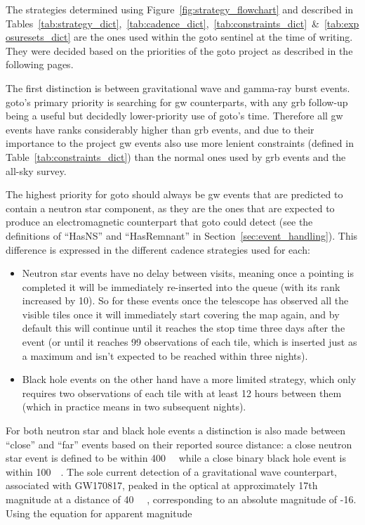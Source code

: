 \begin{colsection}
\begin{colsection}
The strategies determined using Figure~\ref{fig:strategy_flowchart} and described in Tables~\ref{tab:strategy_dict},~\ref{tab:cadence_dict},~\ref{tab:constraints_dict}~\&~\ref{tab:exposuresets_dict} are the ones used within the \gls{goto} sentinel at the time of writing. They were decided based on the priorities of the \gls{goto} project as described in the following pages.

The first distinction is between gravitational wave and gamma-ray burst events. \gls{goto}'s primary priority is searching for \gls{gw} counterparts, with any \gls{grb} follow-up being a useful but decidedly lower-priority use of \gls{goto}'s time. Therefore all \gls{gw} events have ranks considerably higher than \gls{grb} events, and due to their importance to the project \gls{gw} events also use more lenient constraints (defined in Table~\ref{tab:constraints_dict}) than the normal ones used by \gls{grb} events and the all-sky survey.

The highest priority for \gls{goto} should always be \gls{gw} events that are predicted to contain a neutron star component, as they are the ones that are expected to produce an electromagnetic counterpart that \gls{goto} could detect (see the definitions of ``HasNS'' and ``HasRemnant'' in Section~\ref{sec:event_handling}). This difference is expressed in the different cadence strategies used for each:

\begin{itemize}
    \item Neutron star events have no delay between visits, meaning once a pointing is completed it will be immediately re-inserted into the queue (with its rank increased by 10). So for these events once the telescope has observed all the visible tiles once it will immediately start covering the map again, and by default this will continue until it reaches the stop time three days after the event (or until it reaches 99 observations of each tile, which is inserted just as a maximum and isn't expected to be reached within three nights).
    \item Black hole events on the other hand have a more limited  strategy, which only requires two observations of each tile with at least 12 hours between them (which in practice means in two subsequent nights).
\end{itemize}

For both neutron star and black hole events a distinction is also made between ``close'' and ``far'' events based on their reported source distance: a close neutron star event is defined to be within \SI{400}{\mega\parsec} while a close binary black hole event is within \SI{100}{\mega\parsec}. The sole current detection of a gravitational wave counterpart, associated with GW170817, peaked in the optical at approximately 17th magnitude at a distance of \SI{40}{\mega\parsec} \citep{GW170817_followup}, corresponding to an absolute magnitude of -16. Using the equation for apparent magnitude


\end{colsection}
\end{colsection}
